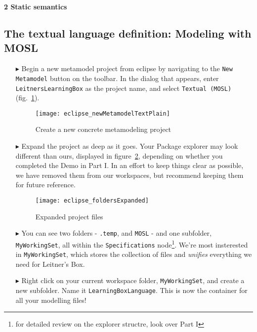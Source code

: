 \newpage
\texHeader

{\bf \Large 2 \hspace{0.5cm}Static semantics}

\subsection{The textual language definition: Modeling with MOSL}
\label{sec:staticConcrete}

\begin{itemize}

\item[$\blacktriangleright$] \hypertarget{static tex}{Begin a} new metamodel project from eclipse by navigating to the \texttt{New Metamodel} button on the toolbar. In the dialog that appears, enter \texttt{LeitnersLearningBox} as the project name, and select \texttt{Textual (MOSL)}  (fig.~\ref{fig:new_project}).

\begin{figure}[htbp]
	\centering
  \texttt{[image: eclipse\_newMetamodelTextPlain]}
	\caption{Create a new concrete metamodeling project}
	\label{fig:new_project}
\end{figure}

\item[$\blacktriangleright$] Expand the project as deep as it goes. Your Package explorer may look different than ours, displayed in figure~\ref{fig:expanded_folders}, depending on whether you completed the Demo in Part I. In an effort to keep things clear as possible, we have removed them from our workspaces, but recommend keeping them for future reference.

\begin{figure}[htbp]
	\centering
  \texttt{[image: eclipse\_foldersExpanded]}
	\caption{Expanded project files}
	\label{fig:expanded_folders}
\end{figure} 

\item[$\blacktriangleright$] You can see two folders - \texttt{.temp}, and \texttt{MOSL} - and one subfolder, \texttt{MyWorkingSet}, all within the \texttt{Specifications} node\footnote{for detailed review on the explorer structre, look over Part I}. We're most insterested in \texttt{MyWorkingSet}, which stores the collection of files and  \emph{unifies} everything we need for Leitner's Box. 

\item[$\blacktriangleright$] Right click on your current workspace folder, \texttt{MyWorkingSet}, and create a new subfolder. Name it \texttt{LearningBoxLanguage}. This is now the container for all your modelling files!



\end{itemize}
